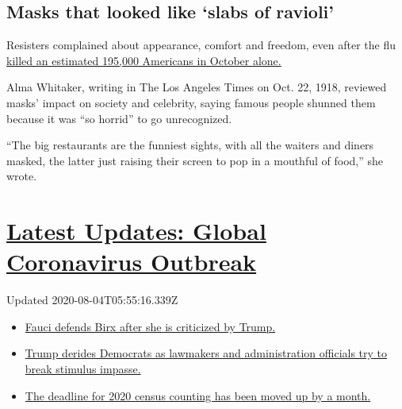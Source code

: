 \hypertarget{masks-that-looked-like-slabs-of-ravioli}{%
\subsection{Masks that looked like `slabs of
ravioli'}\label{masks-that-looked-like-slabs-of-ravioli}}

Resisters complained about appearance, comfort and freedom, even after
the flu
\href{https://www.cdc.gov/flu/pandemic-resources/1918-commemoration/pandemic-timeline-1918.htm}{killed
an estimated 195,000 Americans in October alone.}

Alma Whitaker, writing in The Los Angeles Times on Oct. 22, 1918,
reviewed masks' impact on society and celebrity, saying famous people
shunned them because it was ``so horrid'' to go unrecognized.

``The big restaurants are the funniest sights, with all the waiters and
diners masked, the latter just raising their screen to pop in a mouthful
of food,'' she wrote.

\hypertarget{latest-updates-global-coronavirus-outbreak}{%
\section{\texorpdfstring{\href{https://www.nytimes.com/2020/08/03/world/coronavirus-covid-19.html?action=click\&pgtype=Article\&state=default\&region=MAIN_CONTENT_1\&context=storylines_live_updates}{Latest
Updates: Global Coronavirus
Outbreak}}{Latest Updates: Global Coronavirus Outbreak}}\label{latest-updates-global-coronavirus-outbreak}}

Updated 2020-08-04T05:55:16.339Z

\begin{itemize}
\tightlist
\item
  \href{https://www.nytimes.com/2020/08/03/world/coronavirus-covid-19.html?action=click\&pgtype=Article\&state=default\&region=MAIN_CONTENT_1\&context=storylines_live_updates\#link-4547638f}{Fauci
  defends Birx after she is criticized by Trump.}
\item
  \href{https://www.nytimes.com/2020/08/03/world/coronavirus-covid-19.html?action=click\&pgtype=Article\&state=default\&region=MAIN_CONTENT_1\&context=storylines_live_updates\#link-15e7f995}{Trump
  derides Democrats as lawmakers and administration officials try to
  break stimulus impasse.}
\item
  \href{https://www.nytimes.com/2020/08/03/world/coronavirus-covid-19.html?action=click\&pgtype=Article\&state=default\&region=MAIN_CONTENT_1\&context=storylines_live_updates\#link-e5a2cda}{The
  deadline for 2020 census counting has been moved up by a month.}
\end{itemize}

